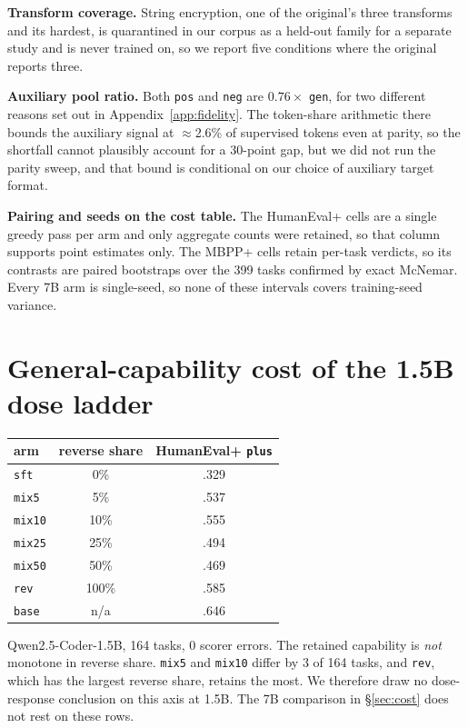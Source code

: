 \documentclass{article}
\newcommand{\arm}[1]{\texttt{#1}}
\begin{document}
\textbf{Transform coverage.} String encryption, one of the original's three transforms and
its hardest, is quarantined in our corpus as a held-out family for a separate study and is
never trained on, so we report five conditions where the original reports three.

\textbf{Auxiliary pool ratio.} Both \arm{pos} and \arm{neg} are $0.76\times$ \arm{gen},
for two different reasons set out in Appendix~\ref{app:fidelity}. The token-share arithmetic
there bounds the auxiliary signal at $\approx$2.6\% of supervised tokens even at parity, so
the shortfall cannot plausibly account for a 30-point gap, but we did not run the parity
sweep, and that bound is conditional on our choice of auxiliary target format.

\textbf{Pairing and seeds on the cost table.} The HumanEval+ cells are a single greedy pass per
arm and only aggregate counts were retained, so that column supports point estimates only. The
MBPP+ cells retain per-task verdicts, so its contrasts are paired bootstraps over the 399 tasks
confirmed by exact McNemar. Every 7B arm is single-seed, so none of these intervals covers
training-seed variance.

\section{General-capability cost of the 1.5B dose ladder}
\label{app:dosecost}
\begin{center}\small
\begin{tabular}{lcc}
\toprule
arm & reverse share & HumanEval+ \texttt{plus} \\
\midrule
\arm{sft} & 0\% & .329 \\
\arm{mix5} & 5\% & .537 \\
\arm{mix10} & 10\% & .555 \\
\arm{mix25} & 25\% & .494 \\
\arm{mix50} & 50\% & .469 \\
\arm{rev} & 100\% & .585 \\
\arm{base} & n/a & .646 \\
\bottomrule
\end{tabular}
\end{center}
Qwen2.5-Coder-1.5B, 164 tasks, 0 scorer errors. The retained capability is \emph{not}
monotone in reverse share. \arm{mix5} and \arm{mix10} differ by 3 of 164 tasks, and
\arm{rev}, which has the largest reverse share, retains the most. We therefore draw no
dose-response conclusion on this axis at 1.5B. The 7B comparison in \S\ref{sec:cost} does not
rest on these rows.
\end{document}
